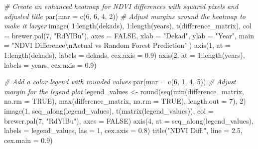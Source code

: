 \documentclass[
]{article}
\newenvironment{Shaded}{}{}
\newcommand{\AttributeTok}[1]{\textcolor[rgb]{0.49,0.56,0.16}{#1}}
\newcommand{\CommentTok}[1]{\textcolor[rgb]{0.38,0.63,0.69}{\textit{#1}}}
\newcommand{\ConstantTok}[1]{\textcolor[rgb]{0.53,0.00,0.00}{#1}}
\newcommand{\DecValTok}[1]{\textcolor[rgb]{0.25,0.63,0.44}{#1}}
\newcommand{\FloatTok}[1]{\textcolor[rgb]{0.25,0.63,0.44}{#1}}
\newcommand{\FunctionTok}[1]{\textcolor[rgb]{0.02,0.16,0.49}{#1}}
\newcommand{\NormalTok}[1]{#1}
\newcommand{\OtherTok}[1]{\textcolor[rgb]{0.00,0.44,0.13}{#1}}
\newcommand{\SpecialCharTok}[1]{\textcolor[rgb]{0.25,0.44,0.63}{#1}}
\newcommand{\StringTok}[1]{\textcolor[rgb]{0.25,0.44,0.63}{#1}}
\begin{document}
\begin{Shaded}
\begin{Highlighting}[]
\CommentTok{\# Create an enhanced heatmap for NDVI differences with squared pixels and adjusted title}
\FunctionTok{par}\NormalTok{(}\AttributeTok{mar =} \FunctionTok{c}\NormalTok{(}\DecValTok{6}\NormalTok{, }\DecValTok{6}\NormalTok{, }\DecValTok{4}\NormalTok{, }\DecValTok{2}\NormalTok{))  }\CommentTok{\# Adjust margins around the heatmap to make it larger}
\FunctionTok{image}\NormalTok{(}
  \DecValTok{1}\SpecialCharTok{:}\FunctionTok{length}\NormalTok{(dekads), }\DecValTok{1}\SpecialCharTok{:}\FunctionTok{length}\NormalTok{(years), }\FunctionTok{t}\NormalTok{(difference\_matrix), }
  \AttributeTok{col =} \FunctionTok{brewer.pal}\NormalTok{(}\DecValTok{7}\NormalTok{, }\StringTok{"RdYlBu"}\NormalTok{), }\AttributeTok{axes =} \ConstantTok{FALSE}\NormalTok{, }\AttributeTok{xlab =} \StringTok{"Dekad"}\NormalTok{, }\AttributeTok{ylab =} \StringTok{"Year"}\NormalTok{,}
  \AttributeTok{main =} \StringTok{"NDVI Difference}\SpecialCharTok{\textbackslash{}n}\StringTok{Actual vs Random Forest Prediction"}
\NormalTok{)}
\FunctionTok{axis}\NormalTok{(}\DecValTok{1}\NormalTok{, }\AttributeTok{at =} \DecValTok{1}\SpecialCharTok{:}\FunctionTok{length}\NormalTok{(dekads), }\AttributeTok{labels =}\NormalTok{ dekads, }\AttributeTok{cex.axis =} \FloatTok{0.9}\NormalTok{)}
\FunctionTok{axis}\NormalTok{(}\DecValTok{2}\NormalTok{, }\AttributeTok{at =} \DecValTok{1}\SpecialCharTok{:}\FunctionTok{length}\NormalTok{(years), }\AttributeTok{labels =}\NormalTok{ years, }\AttributeTok{cex.axis =} \FloatTok{0.9}\NormalTok{) }

\CommentTok{\# Add a color legend with rounded values}
\FunctionTok{par}\NormalTok{(}\AttributeTok{mar =} \FunctionTok{c}\NormalTok{(}\DecValTok{6}\NormalTok{, }\DecValTok{1}\NormalTok{, }\DecValTok{4}\NormalTok{, }\DecValTok{5}\NormalTok{))  }\CommentTok{\# Adjust margin for the legend plot}
\NormalTok{legend\_values }\OtherTok{\textless{}{-}} \FunctionTok{round}\NormalTok{(}\FunctionTok{seq}\NormalTok{(}\FunctionTok{min}\NormalTok{(difference\_matrix, }\AttributeTok{na.rm =} \ConstantTok{TRUE}\NormalTok{), }
                           \FunctionTok{max}\NormalTok{(difference\_matrix, }\AttributeTok{na.rm =} \ConstantTok{TRUE}\NormalTok{), }
                           \AttributeTok{length.out =} \DecValTok{7}\NormalTok{), }\DecValTok{2}\NormalTok{)}
\FunctionTok{image}\NormalTok{(}\DecValTok{1}\NormalTok{, }\FunctionTok{seq\_along}\NormalTok{(legend\_values), }\FunctionTok{t}\NormalTok{(}\FunctionTok{matrix}\NormalTok{(legend\_values)), }
      \AttributeTok{col =} \FunctionTok{brewer.pal}\NormalTok{(}\DecValTok{7}\NormalTok{, }\StringTok{"RdYlBu"}\NormalTok{), }\AttributeTok{axes =} \ConstantTok{FALSE}\NormalTok{)}
\FunctionTok{axis}\NormalTok{(}\DecValTok{4}\NormalTok{, }\AttributeTok{at =} \FunctionTok{seq\_along}\NormalTok{(legend\_values), }
     \AttributeTok{labels =}\NormalTok{ legend\_values, }\AttributeTok{las =} \DecValTok{1}\NormalTok{, }\AttributeTok{cex.axis =} \FloatTok{0.8}\NormalTok{)}
\FunctionTok{title}\NormalTok{(}\StringTok{"NDVI Diff."}\NormalTok{, }\AttributeTok{line =} \FloatTok{2.5}\NormalTok{, }\AttributeTok{cex.main =} \FloatTok{0.9}\NormalTok{)}
\end{Highlighting}
\end{Shaded}
\end{document}
